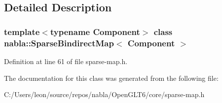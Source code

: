 \subsection{Detailed Description}
\subsubsection*{template$<$typename Component$>$\newline
class nabla\+::\+Sparse\+Bindirect\+Map$<$ Component $>$}



Definition at line 61 of file sparse-\/map.\+h.



The documentation for this class was generated from the following file\+:\begin{DoxyCompactItemize}
\item 
C\+:/\+Users/leon/source/repos/nabla/\+Open\+G\+L\+T6/core/sparse-\/map.\+h\end{DoxyCompactItemize}

